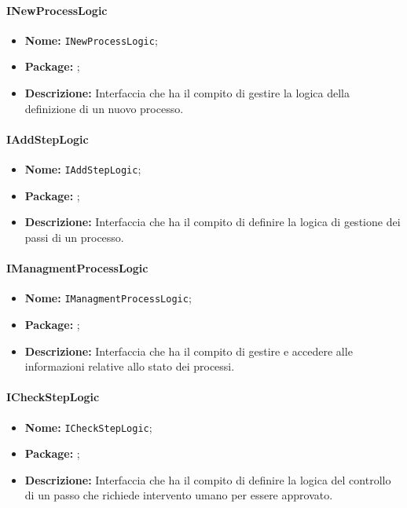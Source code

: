 \paragraph{INewProcessLogic}
\begin{itemize}
\item \textbf{Nome:} \texttt{INewProcessLogic};
\item \textbf{Package:} \texttt{\iLogicAdmin{}};
\item \textbf{Descrizione:} Interfaccia che ha il compito di gestire la logica della definizione di un nuovo processo.
\end{itemize}


\paragraph{IAddStepLogic}
\begin{itemize}
\item \textbf{Nome:} \texttt{IAddStepLogic};
\item \textbf{Package:} \texttt{\iLogicAdmin{}};
\item \textbf{Descrizione:} Interfaccia che ha il compito di definire la logica di gestione dei passi di un processo.
\end{itemize}


\paragraph{IManagmentProcessLogic}

\begin{itemize}
\item \textbf{Nome:} \texttt{IManagmentProcessLogic};
\item \textbf{Package:} \texttt{\iLogicAdmin{}};
\item \textbf{Descrizione:} Interfaccia che ha il compito di gestire e accedere alle informazioni relative allo stato dei processi.
\end{itemize}


\paragraph{ICheckStepLogic}
\begin{itemize}
\item \textbf{Nome:} \texttt{ICheckStepLogic};
\item \textbf{Package:} \texttt{\iLogicAdmin{}};
\item \textbf{Descrizione:} Interfaccia che ha il compito di definire la logica del controllo di un passo che richiede intervento umano per essere approvato.
\end{itemize}


